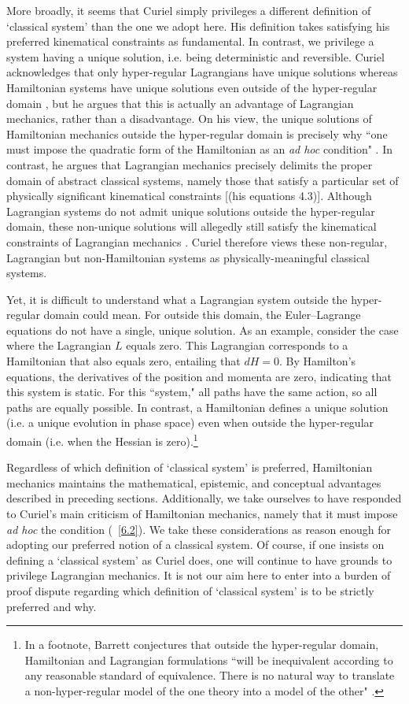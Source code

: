 \documentclass[letterpaper]{article}
\begin{document}
More broadly, it seems that Curiel simply privileges a different definition of `classical system' than the one we adopt here. His definition takes satisfying his preferred kinematical constraints as fundamental. In contrast, we privilege a system having a unique solution, i.e. being deterministic and reversible. Curiel acknowledges that only hyper-regular Lagrangians have unique solutions whereas Hamiltonian systems have unique solutions even outside of the hyper-regular domain \parencites*[291, 308]{Curiel}, but he argues that this is actually an advantage of Lagrangian mechanics, rather than a disadvantage. On his view, the unique solutions of Hamiltonian mechanics outside the hyper-regular domain is precisely why ``one must impose the quadratic form of the Hamiltonian as an \textit{ad hoc} condition" \parencites*[308]{Curiel}. In contrast, he argues that Lagrangian mechanics precisely delimits the proper domain of abstract classical systems, namely those that satisfy a particular set of physically significant kinematical constraints [(his equations 4.3)]. Although Lagrangian systems do not admit unique solutions outside the hyper-regular domain, these non-unique solutions will allegedly still satisfy the kinematical constraints of Lagrangian mechanics \parencites*[311]{Curiel}. Curiel therefore views these non-regular, Lagrangian but non-Hamiltonian systems as physically-meaningful classical systems. 

Yet, it is difficult to understand what a Lagrangian system outside the hyper-regular domain could mean. For outside this domain, the Euler--Lagrange equations do not have a single, unique solution. As an example, consider the case where the Lagrangian $L$ equals zero. This Lagrangian corresponds to a Hamiltonian that also equals zero, entailing that $dH = 0 $. By Hamilton's equations, the derivatives of the position and momenta are zero, indicating that this system is static. For this ``system," all paths have the same action, so all paths are equally possible. In contrast,  a Hamiltonian defines a unique solution (i.e. a unique evolution in phase space) even when outside the hyper-regular domain (i.e. when the Hessian is zero).\footnote{In a footnote, Barrett conjectures that outside the hyper-regular domain, Hamiltonian and Lagrangian formulations ``will be inequivalent according to any reasonable standard of equivalence. There is no natural way to translate a non-hyper-regular model of the one theory into a model of the other" \parencites*[1179]{Barrett2}.} 

Regardless of which definition of `classical system' is preferred, Hamiltonian mechanics maintains the mathematical, epistemic, and conceptual advantages described in preceding sections. Additionally, we take ourselves to have responded to Curiel's main criticism of Hamiltonian mechanics, namely that it must impose \textit{ad hoc} the condition (~\ref{6.2}). We take these considerations as reason enough for adopting our preferred notion of a classical system. Of course, if one insists on defining a `classical system' as Curiel does, one will continue to have grounds to privilege Lagrangian mechanics. It is not our aim here to enter into a burden of proof dispute regarding which definition of `classical system' is to be strictly preferred and why. 
\end{document}
